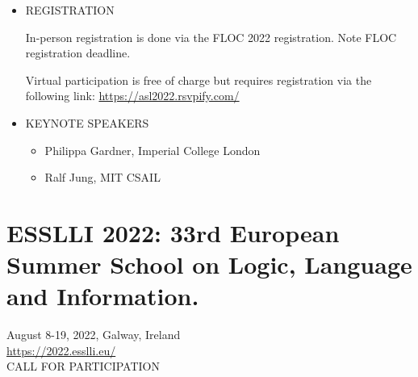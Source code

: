 \documentclass[prodmode,acmtecs]{acmsmall} %
\begin{document}
\begin{itemize}\item  REGISTRATION 
 
  In-person registration is done via the FLOC 2022 registration. Note FLOC registration deadline. 
 
  Virtual participation is free of charge but requires registration via the following link: \href{https://asl2022.rsvpify.com/}{https://asl2022.rsvpify.com/} 
 
\item  KEYNOTE SPEAKERS 
 
\begin{itemize}\item  Philippa Gardner, Imperial College London
\item  Ralf Jung, MIT CSAIL
\end{itemize} 
\end{itemize}\section{ESSLLI 2022: 33rd European Summer School on Logic, Language and Information.}\label{ESSLLI2022}  August 8-19, 2022, Galway, Ireland\\ 
  \href{https://2022.esslli.eu/}{https://2022.esslli.eu/}\\ 
CALL FOR PARTICIPATION 
\end{document}
